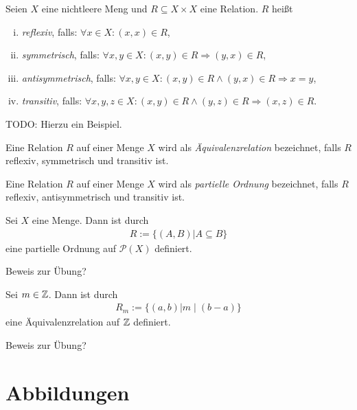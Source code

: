 \begin{mydef} 
    Seien $X$ eine nichtleere Meng und $R \subseteq X \times X$ eine Relation. $R$ heißt
    \begin{enumerate}[(i)]
        \item 
        \textit{reflexiv}, falls: $\forall x \in X: (x,x) \in R$,
        \item 
        \textit{symmetrisch}, falls: $\forall x,y \in X : (x,y) \in R \Rightarrow (y,x) \in R$,
        \item 
        \textit{antisymmetrisch}, falls: $\forall x,y \in X: (x,y) \in R \wedge (y,x) \in R \Rightarrow x=y$,
        \item 
        \textit{transitiv}, falls: $\forall x,y,z \in X: (x,y) \in R \wedge (y,z) \in R \Rightarrow (x,z) \in R$. 
    \end{enumerate}
\end{mydef}

TODO: Hierzu ein Beispiel. 

\begin{mydef}
    Eine Relation $R$ auf einer Menge $X$ wird als \textit{Äquivalenzrelation} bezeichnet, falls $R$ reflexiv, symmetrisch und transitiv ist. 
\end{mydef}

\begin{mydef}
    Eine Relation $R$ auf einer Menge $X$ wird als \textit{partielle Ordnung} bezeichnet, falls $R$ reflexiv, antisymmetrisch und transitiv ist. 
\end{mydef}

\begin{proposition}
    Sei $X$ eine Menge. Dann ist durch 
    \begin{align*}
        R := \{ (A,B) | A \subseteq B \}
    \end{align*}
    eine partielle Ordnung auf $\mathcal{P}(X)$ definiert. 
\end{proposition}

Beweis zur Übung? 

\begin{proposition}
    Sei $m \in \mathbb{Z}$. Dann ist durch 
    \begin{align*}
        R_m := \{(a,b)| m \mid (b-a)\}
    \end{align*}
    eine Äquivalenzrelation auf $\mathbb{Z}$ definiert. 
\end{proposition}

Beweis zur Übung? 

\section{Abbildungen}

